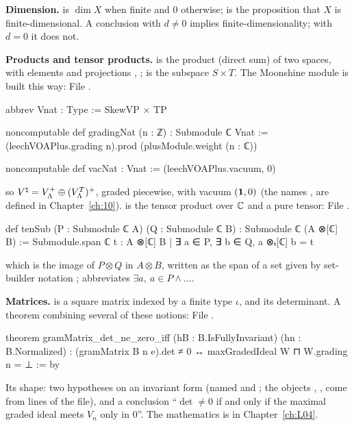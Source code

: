 \textbf{Dimension.}  is $\dim X$ when finite and $0$ otherwise;
 is the proposition that $X$ is finite-dimensional. A conclusion
 with $d\ne0$ implies finite-dimensionality; with $d = 0$ it does not.

\textbf{Products and tensor products.}  is the product (direct sum) of two spaces, with
elements  and projections , ;  is the subspace
$S\times T$. The Moonshine module is built this way:
\noindent File .
\begin{leancode}
abbrev Vnat : Type := SkewVP × TP

noncomputable def gradingNat (n : ℤ) : Submodule ℂ Vnat :=
  (leechVOAPlus.grading n).prod (plusModule.weight (n : ℂ))

noncomputable def vacNat : Vnat := (leechVOAPlus.vacuum, 0)
\end{leancode}
so ${V^{\natural}} = V_{\Lambda}^+\oplus(V_{\Lambda}^T)^+$, graded piecewise, with vacuum $(\mathbf{1},0)$ (the
names ,  are defined in Chapter~\ref{ch:10}).  is the tensor
product over ${\mathbb{C}}$ and  a pure tensor:
\noindent File .
\begin{leancode}
def tenSub (P : Submodule ℂ A) (Q : Submodule ℂ B) : Submodule ℂ (A ⊗[ℂ] B) :=
  Submodule.span ℂ {t : A ⊗[ℂ] B | ∃ a ∈ P, ∃ b ∈ Q, a ⊗ₜ[ℂ] b = t}
\end{leancode}
which is the image of $P\otimes Q$ in $A\otimes B$, written as the span of a set given by set-builder
notation ;  abbreviates $\exists a,\ a\in P\wedge\dots$.

\textbf{Matrices.}  is a square matrix indexed by a finite type $\iota$, and
 its determinant. A theorem combining several of these notions:
\noindent File .
\begin{leancode}
theorem gramMatrix_det_ne_zero_iff (hB : B.IsFullyInvariant) (hn : B.Normalized) :
    (gramMatrix B n e).det ≠ 0 ↔ maxGradedIdeal W ⊓ W.grading n = ⊥ := by
\end{leancode}
Its shape: two hypotheses on an invariant form  (named  and ; the objects
, ,  come from  lines of the file), and a conclusion
``$\det\ne0$ if and only if the maximal graded ideal meets $V_n$ only in $0$''. The mathematics is in
Chapter~\ref{ch:L04}.

